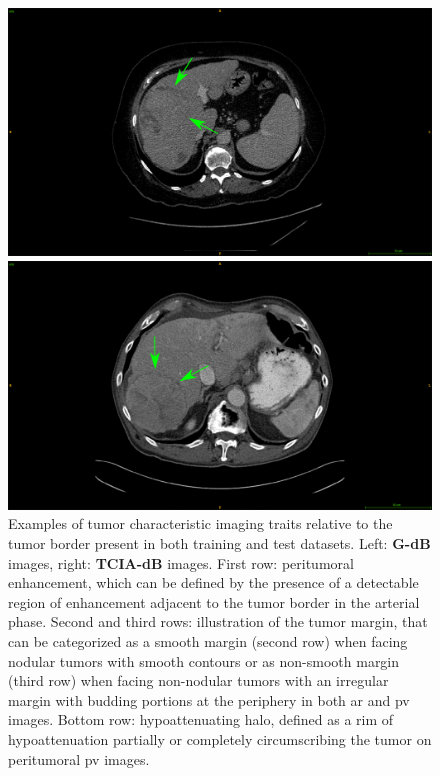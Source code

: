 \documentclass[]{article}
\newcommand{\lmttfont}[1]{{\fontfamily{lmtt}\selectfont #1}}
\begin{document}
\begin{figure}[!ht]
\begin{minipage}{0.45\linewidth}
	\end{minipage} \\
	\begin{minipage}{0.45\linewidth}
		\includegraphics[width=\linewidth]{../Contributions/images/ImagingTraits/ResizeGDB_halo}
	\end{minipage} \hspace{-0.1cm}
	\begin{minipage}{0.45\linewidth}
		\includegraphics[width=\linewidth]{../Contributions/images/ImagingTraits/ResizeTCIA_halo}
	\end{minipage}
	\caption{Examples of tumor characteristic imaging traits relative to the tumor border present in both training and test datasets. Left: \textbf{\lmttfont{G-dB}} images, right: \textbf{\lmttfont{TCIA-dB}} images. First row: peritumoral enhancement, which can be defined by the presence of a detectable region of enhancement adjacent to the tumor border in the arterial phase. Second and third rows: illustration of the tumor margin, that can be categorized as a smooth margin (second row) when facing nodular tumors with smooth contours or as non-smooth margin (third row) when facing non-nodular tumors with an irregular margin with budding portions at the periphery in both \ac{ar} and \ac{pv} images. Bottom row: hypoattenuating halo, defined as a rim of hypoattenuation partially or completely circumscribing the tumor on peritumoral \ac{pv} images. }
	\label{fig:InterDb_imagingTraits}
\end{figure}
\end{document}
